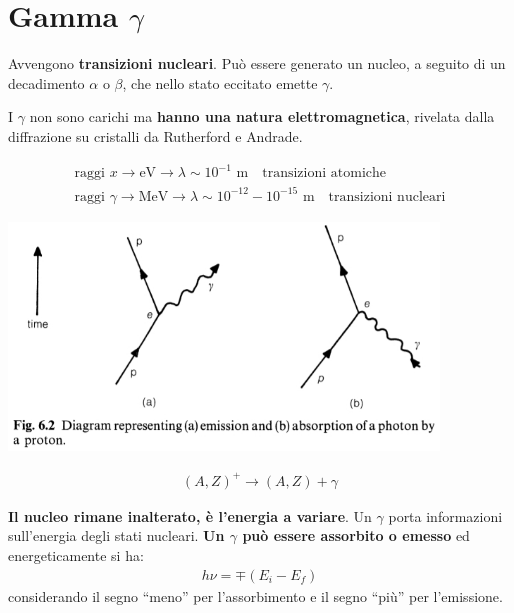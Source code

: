 \documentclass[a4paper,11pt,twoside,openany]{book}
\theoremstyle{definition}
\theoremstyle{plain}
\theoremstyle{plain}
\theoremstyle{definition}
\begin{document}
\section{Gamma $\gamma$} %
Avvengono \textbf{transizioni nucleari}. Può essere generato un nucleo, a seguito di un decadimento $\alpha$ o $\beta$, che nello stato eccitato emette $\gamma$.

I $\gamma$ non sono carichi ma \textbf{hanno una natura elettromagnetica}, rivelata dalla diffrazione su cristalli da Rutherford e Andrade.

\begin{equation}\begin{split}
\textrm{raggi }x\longrightarrow \textrm{eV} \longrightarrow \lambda\sim10^{-1} \textrm{ m} \quad \textrm{transizioni atomiche}\\
\textrm{raggi }\gamma\longrightarrow \textrm{MeV} \longrightarrow \lambda\sim10^{-12}-10^{-15} \textrm{ m} \quad \textrm{transizioni nucleari}
\end{split}\end{equation}

\begin{center}
\includegraphics[width=4.5in]{immagini/gamma-dacay.jpg} %
\end{center}

\begin{equation}\begin{split}
\left(A,Z\right)^+\longrightarrow \left(A,Z\right)+\gamma
\end{split}\end{equation}

\textbf{Il nucleo rimane inalterato, è l'energia a variare}. Un $\gamma$ porta informazioni sull'energia degli stati nucleari. \textbf{Un $\gamma$ può essere assorbito o emesso} ed energeticamente si ha:
\begin{equation}\begin{split}
h\nu=\mp\left(E_i-E_f\right)
\end{split}\end{equation}
considerando il segno ``meno'' per l'assorbimento e il segno ``più'' per l'emissione.
\end{document}
